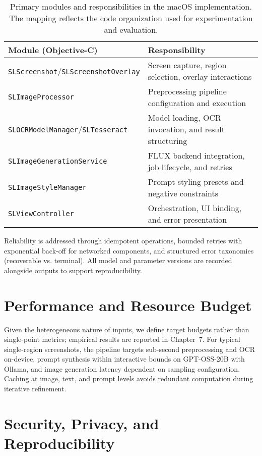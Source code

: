 \begin{table}[t]
  \centering
  \caption{Primary modules and responsibilities in the macOS implementation. The mapping reflects the code organization used for experimentation and evaluation.}
  \label{tab:modules}
  \begin{tabular}{l l}
    \hline
    Module (Objective-C) & Responsibility \\
    \hline
    \texttt{SLScreenshot}/\texttt{SLScreenshotOverlay} & Screen capture, region selection, overlay interactions \\
    \texttt{SLImageProcessor} & Preprocessing pipeline configuration and execution \\
    \texttt{SLOCRModelManager}/\texttt{SLTesseract} & Model loading, OCR invocation, and result structuring \\
    \texttt{SLImageGenerationService} & FLUX backend integration, job lifecycle, and retries \\
    \texttt{SLImageStyleManager} & Prompt styling presets and negative constraints \\
    \texttt{SLViewController} & Orchestration, UI binding, and error presentation \\
    \hline
  \end{tabular}
\end{table}

Reliability is addressed through idempotent operations, bounded retries with exponential back-off for networked components, and structured error taxonomies (recoverable vs. terminal). All model and parameter versions are recorded alongside outputs to support reproducibility.

\section{Performance and Resource Budget}

Given the heterogeneous nature of inputs, we define target budgets rather than single-point metrics; empirical results are reported in Chapter~7. For typical single-region screenshots, the pipeline targets sub-second preprocessing and OCR on-device, prompt synthesis within interactive bounds on GPT-OSS-20B with Ollama, and image generation latency dependent on sampling configuration. Caching at image, text, and prompt levels avoids redundant computation during iterative refinement.

\section{Security, Privacy, and Reproducibility}

